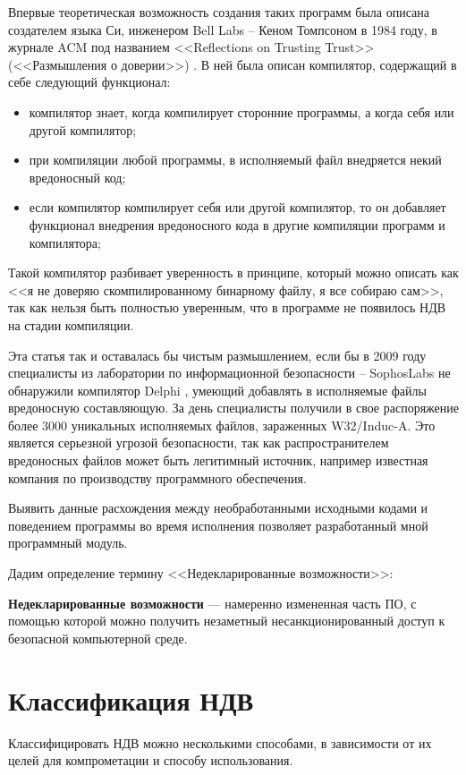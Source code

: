 Впервые теоретическая возможность создания таких программ была описана
создателем языка Си, инженером Bell Labs -- Кеном Томпсоном в 1984 году,
в журнале ACM под названием <<Reflections on Trusting Trust>>
(<<Размышления о доверии>>) \autocite{ken-thompson-hack}.
В ней была описан компилятор, содержащий в себе следующий функционал:
\begin{itemize}
    \item компилятор знает, когда компилирует сторонние программы,
        а когда себя или другой компилятор;
    \item при компиляции любой программы, 
        в исполняемый файл внедряется некий вредоносный код;
    \item если компилятор компилирует себя или другой компилятор,
        то он добавляет функционал внедрения вредоносного кода в 
        другие компиляции программ и компилятора;
\end{itemize}

Такой компилятор разбивает уверенность в принципе, который можно описать
как <<я не доверяю скомпилированному бинарному файлу, я все собираю сам>>,
так как нельзя быть полностью уверенным, что 
в программе не появилось НДВ на стадии компиляции.

Эта статья так и оставалась бы чистым размышлением, если бы в 2009 году специалисты
из лаборатории по информационной безопасности -- SophosLabs не обнаружили компилятор
Delphi \autocite{compile-a-virus}, умеющий добавлять в исполняемые файлы вредоносную составляющую.
За день специалисты получили в свое распоряжение более 3000 уникальных исполняемых
файлов, зараженных W32/Induc-A. Это является серьезной угрозой безопасности, так как
распространителем вредоносных файлов может быть легитимный источник, например
известная компания по производству программного обеспечения.

Выявить данные расхождения между необработанными исходными кодами и 
поведением программы во время исполнения позволяет разработанный мной
программный модуль.

Дадим определение термину <<Недекларированные возможности>>:

\textbf{Недекларированные возможности} \autocite{undeclared-capabilities-antimalware} 
— намеренно измененная часть ПО, с помощью которой можно получить незаметный 
несанкционированный доступ к безопасной компьютерной среде.

\section{Классификация НДВ}\label{sec:ch1/sec2}
Классифицировать НДВ можно несколькими способами, в
зависимости от их целей для компрометации и способу использования.
